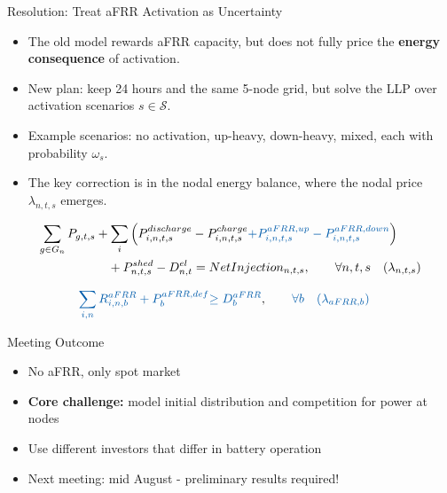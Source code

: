 \documentclass[10pt]{beamer}
\begin{document}
\begin{frame}{Resolution: Treat aFRR Activation as Uncertainty}
\vspace{0.05cm}

\small
\begin{itemize}
    \item The old model rewards aFRR capacity, but does not fully price the \textbf{energy consequence} of activation.
    \item New plan: keep 24 hours and the same 5-node grid, but solve the LLP over activation scenarios \(s \in \mathcal{S}\).
    \item Example scenarios: no activation, up-heavy, down-heavy, mixed, each with probability \(\omega_s\).
    \item The key correction is in the nodal energy balance, where the nodal price \(\lambda_{n,t,s}\) emerges.
\end{itemize}

\vspace{0.15cm}
\footnotesize
\begin{align*}
\sum_{g \in G_n} P_{g,t,s}
&+ \sum_i \Big(
P^{discharge}_{i,n,t,s}
- P^{charge}_{i,n,t,s}
\textcolor{metublue}{+ P^{aFRR,up}_{i,n,t,s}
- P^{aFRR,down}_{i,n,t,s}}
\Big) \\
&\quad
 + P^{shed}_{n,t,s}
 - D^{el}_{n,t}
 = NetInjection_{n,t,s},
 \qquad \forall n,t,s
 \quad (\lambda_{n,t,s})
\end{align*}

\vspace{0.05cm}
\footnotesize
\begin{align*}
\textcolor{metublue}{\sum_{i,n} R^{aFRR}_{i,n,b} + P^{aFRR,def}_{b}}
&\textcolor{metublue}{\geq D^{aFRR}_{b}},
\qquad \textcolor{metublue}{\forall b}
\quad \textcolor{metublue}{(\lambda_{aFRR,b})}
\end{align*}

\end{frame}



\begin{frame}{Meeting Outcome}
\vspace{0.2cm}

\begin{itemize}
    \item No aFRR, only spot market
    \item \textbf{Core challenge:} model initial distribution and competition for power at nodes
    \item Use different investors that differ in battery operation
    \item Next meeting: mid August - preliminary results required!
\end{itemize}

\end{frame}
\end{document}
